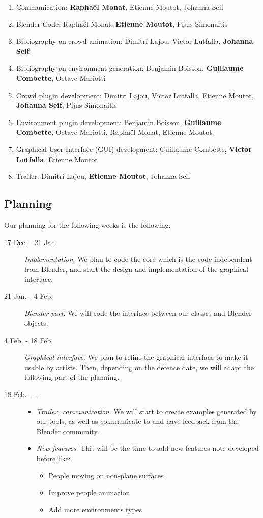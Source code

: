 \documentclass[a4paper,11pt]{article}
\newcommand\bb{Benjamin Boisson}
\newcommand\gc{Guillaume Combette}
\newcommand\dl{Dimitri Lajou}
\newcommand\vl{Victor Lutfalla}
\newcommand\om{Octave Mariotti}
\newcommand\mr{Raphaël Monat} %
\newcommand\me{Etienne Moutot} %
\newcommand\js{Johanna Seif}
\newcommand\ps{Pijus Simonaitis}
\begin{document}
\begin{enumerate}[label=WP\arabic*:, start=0]
\item Communication: \textbf{\mr}, \me, \js
\item Blender Code: \mr, \textbf{\me}, \ps
\item Bibliography on crowd animation: \dl, \vl, \textbf{\js}
\item Bibliography on environment generation: \bb, \textbf{\gc}, \om
\item Crowd plugin development: \dl, \vl, \me, \textbf{\js}, \ps
\item Environment plugin development: \bb, \textbf{\gc}, \om, \mr, \me,
\item Graphical User Interface (GUI) development: \gc, \textbf{\vl}, \me
\item Trailer: \dl, \textbf{\me}, \js
\end{enumerate}

\subsection{Planning}

Our planning for the following weeks is the following:

\begin{description}
  \item[17 Dec. - 21 Jan.] \textit{Implementation}. We plan to code the core which is the code independent from Blender, and start the design and implementation of the graphical interface.
  \item[21 Jan. - 4 Feb.] \textit{Blender part}. We will code the interface between our classes and Blender objects.
  \item[4 Feb. - 18 Feb.] \textit{Graphical interface}. We plan to refine the graphical interface to make it usable by artists. Then, depending on the defence date, we will adapt the following part of the planning.
  \item[18 Feb. - ..] \begin{itemize} \item \textit{Trailer, communication}. We will start to create examples generated by our tools, as well as communicate to and have feedback from the Blender community. \item \textit{New features}.
This will be the time to add new features note developed before like:
  \begin{itemize}
    \item People moving on non-plane surfaces
    \item Improve people animation
    \item Add more environments types
  \end{itemize}
  \end{itemize}
\end{description}
\end{document}
